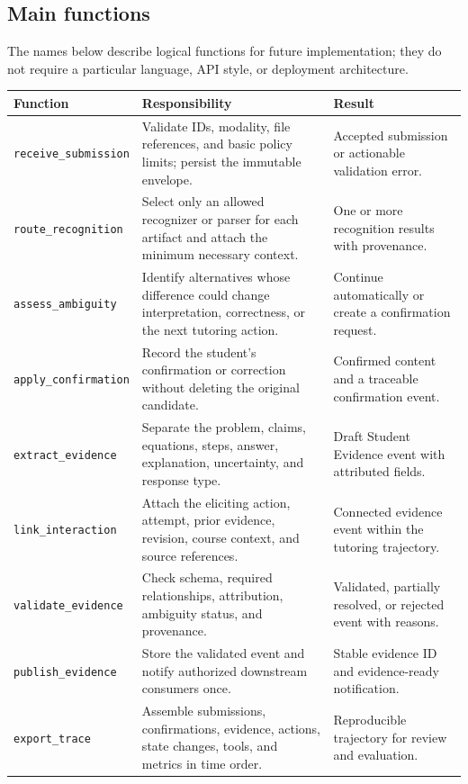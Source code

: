 \documentclass[11pt]{article}
\begin{document}
\subsection{Main functions}

The names below describe logical functions for future implementation; they do not require a particular language, API style, or deployment architecture.

\noindent\begin{tabularx}{\textwidth}{@{}p{}p{}X@{}}
\toprule
\textbf{Function} & \textbf{Responsibility} & \textbf{Result} \\
\midrule
\texttt{receive\_submission} & Validate IDs, modality, file references, and basic policy limits; persist the immutable envelope. & Accepted submission or actionable validation error. \\
\texttt{route\_recognition} & Select only an allowed recognizer or parser for each artifact and attach the minimum necessary context. & One or more recognition results with provenance. \\
\texttt{assess\_ambiguity} & Identify alternatives whose difference could change interpretation, correctness, or the next tutoring action. & Continue automatically or create a confirmation request. \\
\texttt{apply\_confirmation} & Record the student's confirmation or correction without deleting the original candidate. & Confirmed content and a traceable confirmation event. \\
\texttt{extract\_evidence} & Separate the problem, claims, equations, steps, answer, explanation, uncertainty, and response type. & Draft Student Evidence event with attributed fields. \\
\texttt{link\_interaction} & Attach the eliciting action, attempt, prior evidence, revision, course context, and source references. & Connected evidence event within the tutoring trajectory. \\
\texttt{validate\_evidence} & Check schema, required relationships, attribution, ambiguity status, and provenance. & Validated, partially resolved, or rejected event with reasons. \\
\texttt{publish\_evidence} & Store the validated event and notify authorized downstream consumers once. & Stable evidence ID and evidence-ready notification. \\
\texttt{export\_trace} & Assemble submissions, confirmations, evidence, actions, state changes, tools, and metrics in time order. & Reproducible trajectory for review and evaluation. \\
\bottomrule
\end{tabularx}
\end{document}
